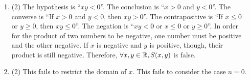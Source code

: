 \documentclass[../MATH135.tex]{subfiles}
\begin{document}
		\begin{enumerate}
			\item
				\begin{tasks}(2)
					\task
						The hypothesis is \enquote{\(xy < 0\)}.
					\task
						The conclusion is \enquote{\(x > 0\) and \(y < 0\)}.
					\task
						The converse is \enquote{If \(x > 0\) and \(y < 0\), then \(xy > 0\)}.
					\task
						The contrapositive is \enquote{If \(x \le 0\) or \(y \ge 0\), then \(xy \le 0\)}.
					\task
						The negation is \enquote{\(xy < 0\) or \(x \le 0\) or \(y \ge 0\)}.
					\task
						In order for the product of two numbers to be negative, one number must be positive and the other negative. If \(x\) is negative and \(y\) is positive, though, their product is still negative. Therefore, \(\forall x, y \in \mathbb{R}, S(x, y)\) is false. 
				\end{tasks}
			\item
				\begin{tasks}(2)
					\task
						This fails to restrict the domain of \(x\).
					\task
						This fails to consider the case \(n = 0\).
						\begin{CJK}{UTF8}{min}
							
						\end{CJK}


\end{tasks}
\end{enumerate}
\end{document}
